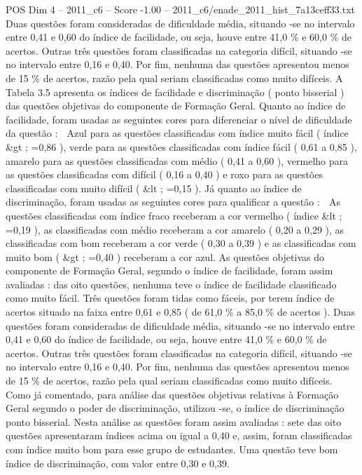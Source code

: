 \begin{textsample}{POS Dim 4 – 2011\_c6 – Score -1.00 – 2011\_c6/enade\_2011\_hist\_7a13ceff33.txt}
Duas questões foram consideradas de dificuldade média, situando -se no intervalo entre 0,41 e 0,60 do índice de facilidade, ou seja, houve entre 41,0 \% e 60,0 \% de acertos.
Outras três questões foram classificadas na categoria difícil, situando -se no intervalo entre 0,16 e 0,40.
Por fim, nenhuma das questões apresentou menos de 15 \% de acertos, razão pela qual seriam classificadas como muito difíceis.
A Tabela 3.5 apresenta os índices de facilidade e discriminação ( ponto bisserial ) das questões objetivas do componente de Formação Geral.
Quanto ao índice de facilidade, foram usadas as seguintes cores para diferenciar o nível de dificuldade da questão :  Azul para as questões classificadas com índice muito fácil ( índice \&gt ; =0,86 ), verde para as questões classificadas com índice fácil ( 0,61 a 0,85 ), amarelo para as questões classificadas com médio ( 0,41 a 0,60 ), vermelho para as questões classificadas com difícil ( 0,16 a 0,40 ) e roxo para as questões classificadas com muito difícil ( \&lt ; =0,15 ).
Já quanto ao índice de discriminação, foram usadas as seguintes cores para qualificar a questão :  As questões classificadas com índice fraco receberam a cor vermelho ( índice \&lt ; =0,19 ), as classificadas com médio receberam a cor amarelo ( 0,20 a 0,29 ), as classificadas com bom receberam a cor verde ( 0,30 a 0,39 ) e as classificadas com muito bom ( \&gt ; =0,40 ) receberam a cor azul.
As questões objetivas do componente de Formação Geral, segundo o índice de facilidade, foram assim avaliadas : das oito questões, nenhuma teve o índice de facilidade classificado como muito fácil.
Três questões foram tidas como fáceis, por terem índice de acertos situado na faixa entre 0,61 e 0,85 ( de 61,0 \% a 85,0 \% de acertos ).
Duas questões foram consideradas de dificuldade média, situando -se no intervalo entre 0,41 e 0,60 do índice de facilidade, ou seja, houve entre 41,0 \% e 60,0 \% de acertos.
Outras três questões foram classificadas na categoria difícil, situando -se no intervalo entre 0,16 e 0,40.
Por fim, nenhuma das questões apresentou menos de 15 \% de acertos, razão pela qual seriam classificadas como muito difíceis.
Como já comentado, para análise das questões objetivas relativas à Formação Geral segundo o poder de discriminação, utilizou -se, o índice de discriminação ponto bisserial.
Nesta análise as questões foram assim avaliadas : sete das oito questões apresentaram índices acima ou igual a 0,40 e, assim, foram classificadas com índice muito bom para esse grupo de estudantes.
Uma questão teve bom índice de discriminação, com valor entre 0,30 e 0,39.

\end{textsample}
